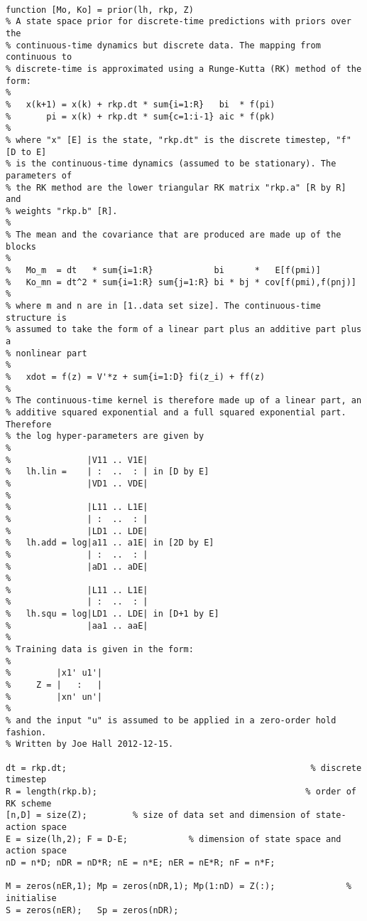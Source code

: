 \begin{lstlisting}

function [Mo, Ko] = prior(lh, rkp, Z)
% A state space prior for discrete-time predictions with priors over the
% continuous-time dynamics but discrete data. The mapping from continuous to 
% discrete-time is approximated using a Runge-Kutta (RK) method of the form:
%
%   x(k+1) = x(k) + rkp.dt * sum{i=1:R}   bi  * f(pi)
%       pi = x(k) + rkp.dt * sum{c=1:i-1} aic * f(pk)
%
% where "x" [E] is the state, "rkp.dt" is the discrete timestep, "f" [D to E]
% is the continuous-time dynamics (assumed to be stationary). The parameters of
% the RK method are the lower triangular RK matrix "rkp.a" [R by R] and 
% weights "rkp.b" [R].
%
% The mean and the covariance that are produced are made up of the blocks
%
%   Mo_m  = dt   * sum{i=1:R}            bi      *   E[f(pmi)]
%   Ko_mn = dt^2 * sum{i=1:R} sum{j=1:R} bi * bj * cov[f(pmi),f(pnj)] 
%
% where m and n are in [1..data set size]. The continuous-time structure is
% assumed to take the form of a linear part plus an additive part plus a
% nonlinear part
%
%   xdot = f(z) = V'*z + sum{i=1:D} fi(z_i) + ff(z)
%
% The continuous-time kernel is therefore made up of a linear part, an
% additive squared exponential and a full squared exponential part. Therefore 
% the log hyper-parameters are given by
%
%               |V11 .. V1E|
%   lh.lin =    | :  ..  : | in [D by E]
%               |VD1 .. VDE|
%
%               |L11 .. L1E|
%               | :  ..  : |
%               |LD1 .. LDE|
%   lh.add = log|a11 .. a1E| in [2D by E]
%               | :  ..  : |
%               |aD1 .. aDE|
%
%               |L11 .. L1E|
%               | :  ..  : |
%   lh.squ = log|LD1 .. LDE| in [D+1 by E]
%               |aa1 .. aaE|
%
% Training data is given in the form:
%
%         |x1' u1'|
%     Z = |   :   |
%         |xn' un'|
%
% and the input "u" is assumed to be applied in a zero-order hold fashion.
% Written by Joe Hall 2012-12-15.
    
dt = rkp.dt;                                                % discrete timestep
R = length(rkp.b);                                         % order of RK scheme
[n,D] = size(Z);         % size of data set and dimension of state-action space
E = size(lh,2); F = D-E;            % dimension of state space and action space
nD = n*D; nDR = nD*R; nE = n*E; nER = nE*R; nF = n*F;

M = zeros(nER,1); Mp = zeros(nDR,1); Mp(1:nD) = Z(:);              % initialise
S = zeros(nER);   Sp = zeros(nDR);


\end{lstlisting}
